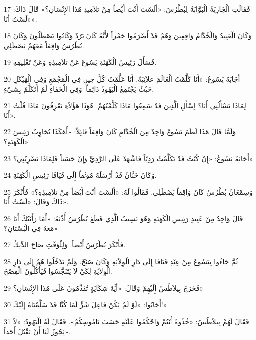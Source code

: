 \par 17 فَقَالَتِ الْجَارِيَةُ الْبَوَّابَةُ لِبُطْرُسَ: «أَلَسْتَ أَنْتَ أَيْضاً مِنْ تلاَمِيذِ هَذَا الإِنْسَانِ؟» قَالَ ذَاكَ: «لَسْتُ أَنَا».
\par 18 وَكَانَ الْعَبِيدُ وَالْخُدَّامُ وَاقِفِينَ وَهُمْ قَدْ أَضْرَمُوا جَمْراً لأَنَّهُ كَانَ بَرْدٌ وَكَانُوا يَصْطَلُونَ وَكَانَ بُطْرُسُ وَاقِفاً مَعَهُمْ يَصْطَلِي.
\par 19 فَسَأَلَ رَئِيسُ الْكَهَنَةِ يَسُوعَ عَنْ تلاَمِيذِهِ وَعَنْ تَعْلِيمِهِ.
\par 20 أَجَابَهُ يَسُوعُ: «أَنَا كَلَّمْتُ الْعَالَمَ علاَنِيَةً. أَنَا عَلَّمْتُ كُلَّ حِينٍ فِي الْمَجْمَعِ وَفِي الْهَيْكَلِ حَيْثُ يَجْتَمِعُ الْيَهُودُ دَائِماً. وَفِي الْخَفَاءِ لَمْ أَتَكَلَّمْ بِشَيْءٍ.
\par 21 لِمَاذَا تَسْأَلُنِي أَنَا؟ اِسْأَلِ الَّذِينَ قَدْ سَمِعُوا مَاذَا كَلَّمْتُهُمْ. هُوَذَا هَؤُلاَءِ يَعْرِفُونَ مَاذَا قُلْتُ أَنَا».
\par 22 وَلَمَّا قَالَ هَذَا لَطَمَ يَسُوعَ وَاحِدٌ مِنَ الْخُدَّامِ كَانَ وَاقِفاً قَائِلاً: «أَهَكَذَا تُجَاوِبُ رَئِيسَ الْكَهَنَةِ؟»
\par 23 أَجَابَهُ يَسُوعُ: «إِنْ كُنْتُ قَدْ تَكَلَّمْتُ رَدِيّاً فَاشْهَدْ عَلَى الرَّدِيِّ وَإِنْ حَسَناً فَلِمَاذَا تَضْرِبُنِي؟»
\par 24 وَكَانَ حَنَّانُ قَدْ أَرْسَلَهُ مُوثَقاً إِلَى قَيَافَا رَئِيسِ الْكَهَنَةِ.
\par 25 وَسِمْعَانُ بُطْرُسُ كَانَ وَاقِفاً يَصْطَلِي. فَقَالُوا لَهُ: «أَلَسْتَ أَنْتَ أَيْضاً مِنْ تلاَمِيذِهِ؟» فَأَنْكَرَ ذَاكَ وَقَالَ: «لَسْتُ أَنَا».
\par 26 قَالَ وَاحِدٌ مِنْ عَبِيدِ رَئِيسِ الْكَهَنَةِ وَهُوَ نَسِيبُ الَّذِي قَطَعَ بُطْرُسُ أُذْنَهُ: «أَمَا رَأَيْتُكَ أَنَا مَعَهُ فِي الْبُسْتَانِ؟»
\par 27 فَأَنْكَرَ بُطْرُسُ أَيْضاً. وَلِلْوَقْتِ صَاحَ الدِّيكُ.
\par 28 ثُمَّ جَاءُوا بِيَسُوعَ مِنْ عِنْدِ قَيَافَا إِلَى دَارِ الْوِلاَيَةِ وَكَانَ صُبْحٌ. وَلَمْ يَدْخُلُوا هُمْ إِلَى دَارِ الْوِلاَيَةِ لِكَيْ لاَ يَتَنَجَّسُوا فَيَأْكُلُونَ الْفِصْحَ.
\par 29 فَخَرَجَ بِيلاَطُسُ إِلَيْهِمْ وَقَالَ: «أَيَّةَ شِكَايَةٍ تُقَدِّمُونَ عَلَى هَذَا الإِنْسَانِ؟»
\par 30 أَجَابُوا: «لَوْ لَمْ يَكُنْ فَاعِلَ شَرٍّ لَمَا كُنَّا قَدْ سَلَّمْنَاهُ إِلَيْكَ!»
\par 31 فَقَالَ لَهُمْ بِيلاَطُسُ: «خُذُوهُ أَنْتُمْ وَاحْكُمُوا عَلَيْهِ حَسَبَ نَامُوسِكُمْ». فَقَالَ لَهُ الْيَهُودُ: «لاَ يَجُوزُ لَنَا أَنْ نَقْتُلَ أَحَداً».
